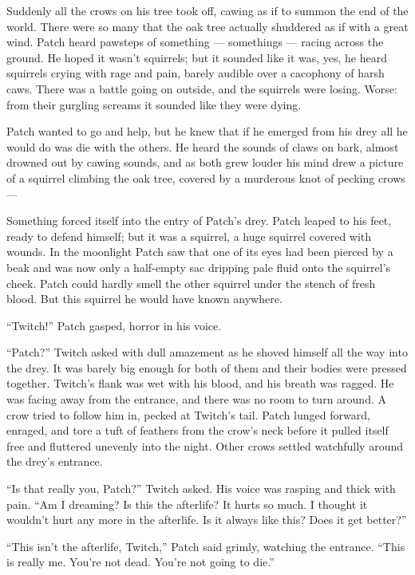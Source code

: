 \documentclass[12pt]{memoir}
\begin{document}
Suddenly all the crows on his tree took off, cawing as if to summon
the end of the world. There were so many that the oak tree actually
shuddered as if with a great wind. Patch heard pawsteps of something —
somethings — racing across the ground. He hoped it wasn’t squirrels;
but it sounded like it was, yes, he heard squirrels crying with rage
and pain, barely audible over a cacophony of harsh caws. There was a
battle going on outside, and the squirrels were losing. Worse: from
their gurgling screams it sounded like they were dying.

Patch wanted to go and help, but he knew that if he emerged from his
drey all he would do was die with the others. He heard the sounds of
claws on bark, almost drowned out by cawing sounds, and as both grew
louder his mind drew a picture of a squirrel climbing the oak tree,
covered by a murderous knot of pecking crows —

Something forced itself into the entry of Patch’s drey. Patch leaped
to his feet, ready to defend himself; but it was a squirrel, a huge
squirrel covered with wounds. In the moonlight Patch saw that one of
its eyes had been pierced by a beak and was now only a half-empty sac
dripping pale fluid onto the squirrel’s cheek. Patch could hardly
smell the other squirrel under the stench of fresh blood. But this
squirrel he would have known anywhere.

“Twitch!” Patch gasped, horror in his voice.

“Patch?” Twitch asked with dull amazement as he shoved himself all the
way into the drey. It was barely big enough for both of them and their
bodies were pressed together. Twitch’s flank was wet with his blood,
and his breath was ragged. He was facing away from the entrance, and
there was no room to turn around. A crow tried to follow him in,
pecked at Twitch’s tail. Patch lunged forward, enraged, and tore a
tuft of feathers from the crow’s neck before it pulled itself free and
fluttered unevenly into the night. Other crows settled watchfully
around the drey’s entrance.

“Is that really you, Patch?” Twitch asked. His voice was rasping and
thick with pain. “Am I dreaming? Is this the afterlife? It hurts so
much. I thought it wouldn’t hurt any more in the afterlife. Is it
always like this? Does it get better?”

“This isn’t the afterlife, Twitch,” Patch said grimly, watching the
entrance. “This is really me. You’re not dead. You’re not going to
die.”
\end{document}

